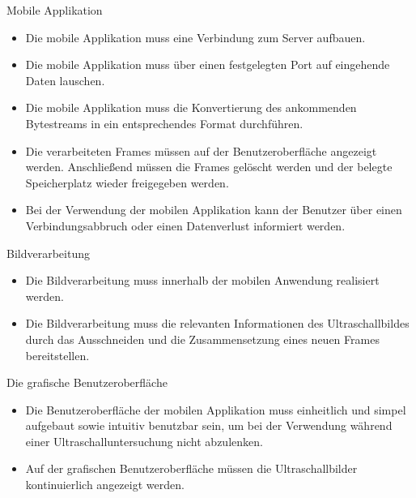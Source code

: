 \begin{minipage}{\textwidth}
Mobile Applikation
\begin{itemize}
\item Die mobile Applikation muss eine Verbindung zum Server aufbauen.
\item Die mobile Applikation muss über einen festgelegten Port auf eingehende Daten lauschen.
\item Die mobile Applikation muss die Konvertierung des ankommenden Bytestreams in ein entsprechendes Format durchführen.
\item Die verarbeiteten Frames müssen auf der Benutzeroberfläche angezeigt werden. Anschließend müssen die Frames gelöscht werden und der belegte Speicherplatz wieder freigegeben werden. 
\item Bei der Verwendung der mobilen Applikation kann der Benutzer über einen Verbindungsabbruch oder einen Datenverlust informiert werden.
\end{itemize}
\end{minipage}

\begin{minipage}{\textwidth}
Bildverarbeitung
\begin{itemize}
\item Die Bildverarbeitung muss innerhalb der mobilen Anwendung realisiert werden.
\item Die Bildverarbeitung muss die relevanten Informationen des Ultraschallbildes durch das Ausschneiden und die Zusammensetzung eines neuen Frames bereitstellen.
\end{itemize}
\end{minipage}

\begin{minipage}{\textwidth}
Die grafische Benutzeroberfläche
\begin{itemize}
\item Die Benutzeroberfläche der mobilen Applikation muss einheitlich und simpel aufgebaut sowie intuitiv benutzbar sein, um bei der Verwendung während einer Ultraschalluntersuchung nicht abzulenken.
\item Auf der grafischen Benutzeroberfläche müssen die Ultraschallbilder kontinuierlich angezeigt werden.
\end{itemize}
\end{minipage}
